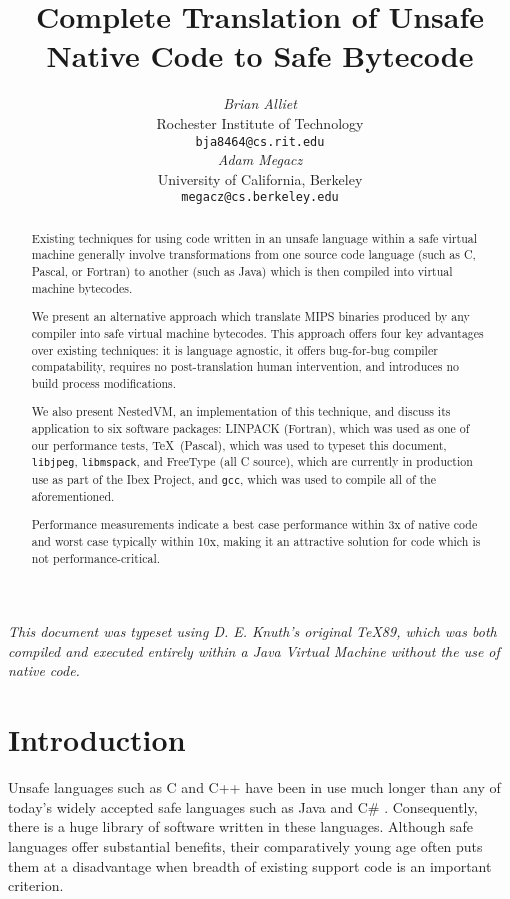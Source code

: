 \documentclass{acmconf}
\title{\textbf{\textsf{
Complete Translation of Unsafe Native Code to Safe Bytecode
}}}
\date{}
\author{\begin{tabular}{@{}c@{}}
        {\em {Brian Alliet}} \\
        {Rochester Institute of Technology}\\
        {\tt bja8464@cs.rit.edu}
   \end{tabular}\hskip 1in\begin{tabular}{@{}c@{}}
        {\em {Adam Megacz}} \\
        {University of California, Berkeley} \\
        {\tt megacz@cs.berkeley.edu}
\end{tabular}}
\begin{document}
\maketitle

{\it This document was typeset using D. E. Knuth's original \TeX 89,
     which was both compiled and executed entirely within a Java
     Virtual Machine without the use of native code.}

\begin{abstract}

Existing techniques for using code written in an unsafe language
within a safe virtual machine generally involve transformations from
one source code language (such as C, Pascal, or Fortran) to another
(such as Java) which is then compiled into virtual machine bytecodes.

We present an alternative approach which translate MIPS binaries
produced by any compiler into safe virtual machine bytecodes.  This
approach offers four key advantages over existing techniques: it is
language agnostic, it offers bug-for-bug compiler compatability,
requires no post-translation human intervention, and introduces no
build process modifications.

We also present NestedVM, an implementation of this technique, and
discuss its application to six software packages: LINPACK (Fortran),
which was used as one of our performance tests, \TeX\ (Pascal), which
was used to typeset this document, {\tt libjpeg}, {\tt libmspack}, and
FreeType (all C source), which are currently in production use as part
of the Ibex Project, and {\tt gcc}, which was used to compile all of
the aforementioned.

Performance measurements indicate a best case performance within 3x of
native code and worst case typically within 10x, making it an
attractive solution for code which is not performance-critical.

\end{abstract}

\section{Introduction}

Unsafe languages such as C \cite{KR} and C++ \cite{soustroup} have
been in use much longer than any of today's widely accepted safe
languages such as Java \cite{java} and C\# \cite{csharp}.
Consequently, there is a huge library of software written in these
languages.  Although safe languages offer substantial benefits, their
comparatively young age often puts them at a disadvantage when breadth
of existing support code is an important criterion.
\end{document}
